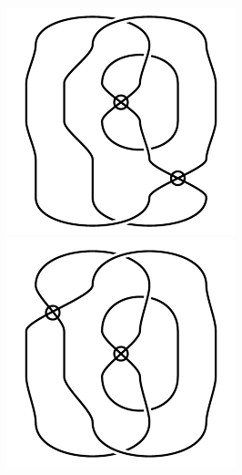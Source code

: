 \begin{figure}[H]
\begin{minipage}[b]{.18\linewidth}
\end{minipage}
\begin{minipage}[b]{.18\linewidth}
\centering
\includegraphics[width=\linewidth]{../data/virtual_4_54.png}
\end{minipage}
\begin{minipage}[b]{.18\linewidth}
\centering
\includegraphics[width=\linewidth]{../data/virtual_4_55.png}

\end{minipage}
\end{figure}
